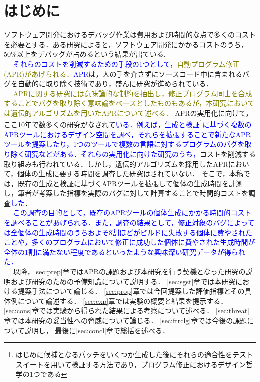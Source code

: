 \documentclass[uplatex,dvipdfmx,a4paper]{jsarticle}
\newcommand{\modified}[1]{{\textcolor{blue}{#1}}}
\newcommand{\modifiedTwo}[1]{{\textcolor{olive}{#1}}}
\let\oldcite\cite
\renewcommand{\cite}[1]{\xspace\oldcite{#1}}
\begin{document}
\newcommand{\kgp}{kGenProg}
\newcommand{\mcw}{Macaw}
\clearpage
\section{はじめに}\label{sec:intro}
ソフトウェア開発におけるデバッグ作業は費用および時間的な点で多くのコストを必要とする．ある研究によると，ソフトウェア開発にかかるコストのうち，50\%以上をデバッグが占めるという結果が出ている\cite{5386906, Britton_reversibledebugging}.\\　
\modified{それらのコストを削減するための手段の1つとして，}\modifiedTwo{自動プログラム修正(APR)があげられる．}\modified{APR}は，人の手を介さずにソースコード中に含まれるバグを自動的に取り除く技術であり，盛んに研究が進められている\cite{gazzola2018automatic, goues2019automated}．\\　
\modifiedTwo{APRに関する研究には意味論的な制約を抽出し，修正プログラム同士を合成することでバグを取り除く意味論をベースとしたものもある\cite{le2018overfitting}が，本研究においては遺伝的アルゴリズムを用いたAPRについて述べる．}
APRの実用化に向けて，ここ10年で数多くの研究がなされて\modified{いる．例えば，生成と検証\footnote{はじめに候補となるパッチをいくつか生成した後にそれらの適合性をテストスイートを用いて検証する方法であり，プログラム修正におけるデザイン哲学の1つである\cite{martinez2019astor}}に基づく複数のAPRツールにおけるデザイン空間を調べ，それらを拡張することで新たなAPRツールを提案したり\cite{martinez2019astor}，1つのツールで複数の言語に対するプログラムのバグを取り除く研究\cite{lin2017quixbugs}などがある．それらの実用化に向けた研究のうち，}コストを削減する取り組みも行われている\cite{id692,qi2013efficient}．しかし，遺伝的アルゴリズムを採用したAPRにおいて，個体の生成に要する時間を調査した研究はされていない．
そこで，本稿では，既存の生成と検証に基づくAPRツールを拡張して個体の生成時間を計測し，筆者が考案した指標を実際のバグに対して計算することで時間的コストを調査\modified{した}．\\　
\modified{この調査の目的として，既存のAPRツールの個体生成にかかる時間的コストを調べることがあげられる．また，調査の結果として，修正対象のバグによっては全個体の生成時間のうちおよそ8割ほどがビルドに失敗する個体に費やされたことや，多くのプログラムにおいて修正に成功した個体に費やされた生成時間が全体の1割に満たない程度であるといったような興味深い研究データが得られた．}\\　
以降，\ref{sec:prep}章ではAPRの課題および本研究を行う契機となった研究の説明および研究のための予備知識について説明する．
\ref{sec:sgst}章では本研究における提案手法について論じる．
\ref{sec:prop}章では今回提案した評価指標とその具体例について論述する．
\ref{sec:exp}章では実験の概要と結果を提示する．
\ref{sec:cons}章では実験から得られた結果による考察について述べる．
\ref{sec:threat}章では本研究の妥当性への脅威について論じる．
\ref{sec:ftrclg}章では今後の課題について説明し，
最後に\ref{sec:concl}章で総括を述べる．
\end{document}
